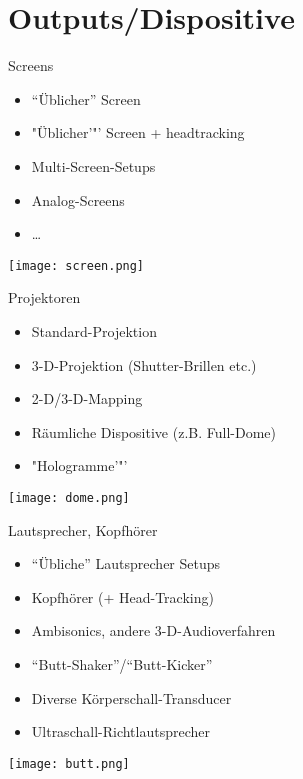 \section{Outputs/Dispositive}
 \frame{\sectionpage}

\begin{frame}{Screens}

\begin{itemize}
	\item "`Üblicher"' Screen
	\item "Üblicher'"' Screen + headtracking
	\item Multi-Screen-Setups
	\item Analog-Screens
	\item \dots{}

\end{itemize}

\begin{center}
\texttt{[image: screen.png]}
\end{center}




\end{frame}


\begin{frame}{Projektoren}
\begin{itemize}
	\item Standard-Projektion
	\item 3-D-Projektion (Shutter-Brillen etc.)
	\item 2-D/3-D-Mapping
	\item Räumliche Dispositive (z.B. Full-Dome)
	\item "Hologramme'"'
\end{itemize}

\begin{center}
\texttt{[image: dome.png]}
\end{center}
\end{frame}


\begin{frame}{Lautsprecher, Kopfhörer}
\begin{itemize}
	\item "`Übliche"' Lautsprecher Setups
	\item Kopfhörer (+ Head-Tracking)
	\item Ambisonics, andere 3-D-Audioverfahren
	\item "`Butt-Shaker"'/"`Butt-Kicker"'
	\item Diverse Körperschall-Transducer
	\item Ultraschall-Richtlautsprecher
\end{itemize}

\begin{center}
\texttt{[image: butt.png]}
\end{center}

\end{frame}

